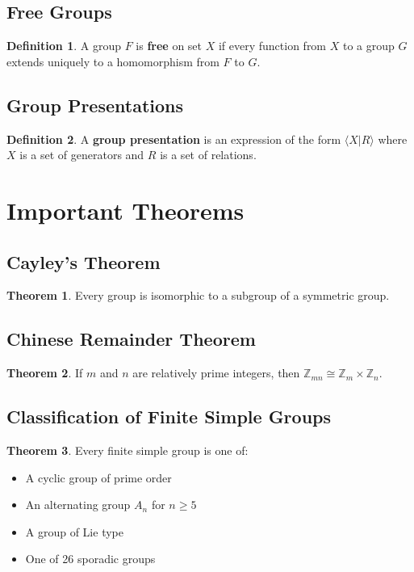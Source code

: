 \documentclass[11pt]{article}
\theoremstyle{definition}
\newtheorem{definition}{Definition}[section]
\newtheorem{theorem}{Theorem}[section]
\begin{document}
\subsection{Free Groups}
\begin{definition}
A group $F$ is \textbf{free} on set $X$ if every function from $X$ to a group $G$ extends uniquely to a homomorphism from $F$ to $G$.
\end{definition}

\subsection{Group Presentations}
\begin{definition}
A \textbf{group presentation} is an expression of the form $\langle X | R \rangle$ where $X$ is a set of generators and $R$ is a set of relations.
\end{definition}

\section{Important Theorems}

\subsection{Cayley's Theorem}
\begin{theorem}
Every group is isomorphic to a subgroup of a symmetric group.
\end{theorem}

\subsection{Chinese Remainder Theorem}
\begin{theorem}
If $m$ and $n$ are relatively prime integers, then $\mathbb{Z}_{mn} \cong \mathbb{Z}_m \times \mathbb{Z}_n$.
\end{theorem}

\subsection{Classification of Finite Simple Groups}
\begin{theorem}
Every finite simple group is one of:
\begin{itemize}
    \item A cyclic group of prime order
    \item An alternating group $A_n$ for $n \geq 5$
    \item A group of Lie type
    \item One of 26 sporadic groups
\end{itemize}
\end{theorem}
\end{document}

